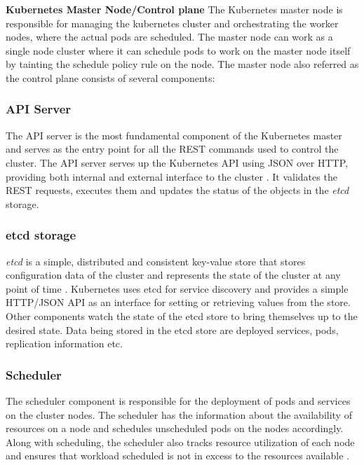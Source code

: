\documentclass[9pt,twocolumn,twoside]{../../styles/osajnl}
\begin{document}
\textbf{Kubernetes Master Node/Control plane}
\newline
The Kubernetes master node is responsible for managing the kubernetes
cluster and orchestrating the worker nodes, where the actual pods are
scheduled. The master node can work as a single node cluster where it
can schedule pods to work on the master node itself by tainting the
schedule policy rule on the node. The master node also referred as
the control plane consists of several components:

\subsubsection{API Server}
The API server is the most fundamental component of the Kubernetes
master and serves as the entry point for all the REST commands used to
control the cluster. The API server serves up the Kubernetes API using
JSON over HTTP, providing both internal and external interface to the
cluster \cite{www-kubernetes-digitalocean}
\cite{www-apiserver-kmblog}. It validates the REST requests, executes
them and updates the status of the objects in the \emph{etcd} storage.

\subsubsection{etcd storage}
\emph{etcd} is a simple, distributed and consistent key-value store
that stores configuration data of the cluster and represents the state
of the cluster at any point of time
\cite{www-wiki-kubernetes}. Kubernetes uses etcd for service discovery
and provides a simple HTTP/JSON API as an interface for setting or
retrieving values from the store. Other components watch the state of
the etcd store to bring themselves up to the desired state. Data being
stored in the etcd store are deployed services, pods, replication
information etc.

\subsubsection{Scheduler}
The scheduler component is responsible for the deployment of pods and
services on the cluster nodes. The scheduler has the information about
the availability of resources on a node and schedules unscheduled pods
on the nodes accordingly. Along with scheduling, the scheduler also
tracks resource utilization of each node and ensures that workload
scheduled is not in excess to the resources available
\cite{www-wiki-kubernetes}.
\end{document}
